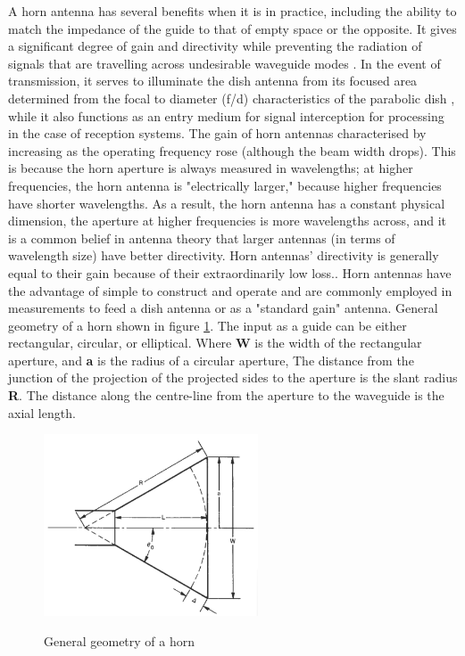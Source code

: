{A horn antenna has several benefits when it is in practice, including the ability to match the impedance of the guide to that of empty space or the opposite. It gives a significant degree of gain and directivity while preventing the radiation of signals that are travelling across undesirable waveguide modes \cite{daniyan2014horn,ja2018evaluation}. In the event of transmission, it serves to illuminate the dish antenna from its focused area determined from the focal to diameter (f/d) characteristics of the parabolic dish \cite{daniyan2014horn, ja2018evaluation}, while it also functions as an entry medium for signal interception for processing in the case of reception systems.
The gain of horn antennas characterised by increasing as the operating frequency rose (although the beam width drops). This is because the horn aperture is always measured in wavelengths; at higher frequencies, the horn antenna is "electrically larger," because higher frequencies have shorter wavelengths. As a result, the horn antenna has a constant physical dimension, the aperture at higher frequencies is more wavelengths across, and it is a common belief in antenna theory that larger antennas (in terms of wavelength size) have better directivity. Horn antennas' directivity is generally equal to their gain because of their extraordinarily low loss.\cite{ja2018evaluation}. Horn antennas have the advantage of simple to construct and operate and are commonly employed in measurements to feed a dish antenna or as a "standard gain" antenna. General geometry of a horn shown in figure \ref{fig:4.4}. The input as a guide can be either rectangular, circular, or elliptical. Where \textbf{W} is the width of the rectangular aperture, and \textbf{a} is the radius of a circular aperture, The distance from the junction of the projection of the projected sides to the aperture is the slant radius \textbf{R}. The distance along the centre-line from the aperture to the waveguide is the axial length.


\begin{figure}[htp]
 \centering
\includegraphics[width=2.5in]{Figures/geometry_of_a_horn.png}
\caption{General geometry of a horn}
\cite{milligan2005modern}
\label{fig:4.4}
\end{figure}

}
